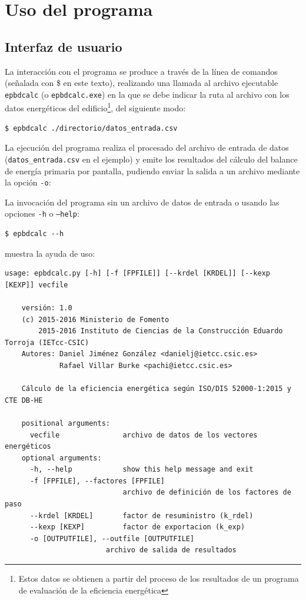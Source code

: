 \documentclass[10pt,notitlepage,oneside,a4paper]{article}
\begin{document}
\section{Uso del programa}
\label{sec:usoprograma}

\subsection{Interfaz de usuario}

La interacción con el programa se produce a través de la línea de comandos (señalada con \$ en este texto), realizando una llamada al archivo ejecutable \texttt{epbdcalc} (o \texttt{epbdcalc.exe}) en la que se debe indicar la ruta al archivo con los datos energéticos del edificio\footnote{Estos datos se obtienen a partir del proceso de los resultados de un programa de evaluación de la eficiencia energética}, del siguiente modo:

\begin{Verbatim}[fontsize=\small]
	$ epbdcalc ./directorio/datos_entrada.csv
\end{Verbatim}

La ejecución del programa realiza el procesado del archivo de entrada de datos (\texttt{datos\_entrada.csv} en el ejemplo) y emite los resultados  del cálculo del balance de energía primaria por pantalla, pudiendo enviar la salida a un archivo mediante la opción \texttt{-o}:


La invocación del programa sin un archivo de datos de entrada o usando las opciones \texttt{-h} o \texttt{--help}:

\begin{Verbatim}[fontsize=\small]
	$ epbdcalc --h
\end{Verbatim}

 muestra la ayuda de uso:

\begin{Verbatim}[fontsize=\small]
    usage: epbdcalc.py [-h] [-f [FPFILE]] [--krdel [KRDEL]] [--kexp [KEXP]] vecfile

	versión: 1.0
	(c) 2015-2016 Ministerio de Fomento
	    2015-2016 Instituto de Ciencias de la Construcción Eduardo Torroja (IETcc-CSIC)
	Autores: Daniel Jiménez González <danielj@ietcc.csic.es>
	         Rafael Villar Burke <pachi@ietcc.csic.es>

    Cálculo de la eficiencia energética según ISO/DIS 52000-1:2015 y CTE DB-HE

    positional arguments:
      vecfile               archivo de datos de los vectores energéticos
    optional arguments:
      -h, --help            show this help message and exit
      -f [FPFILE], --factores [FPFILE]
                            archivo de definición de los factores de paso
      --krdel [KRDEL]       factor de resuministro (k_rdel)
      --kexp [KEXP]         factor de exportacion (k_exp)
      -o [OUTPUTFILE], --outfile [OUTPUTFILE]
                        archivo de salida de resultados
\end{Verbatim}
\end{document}
